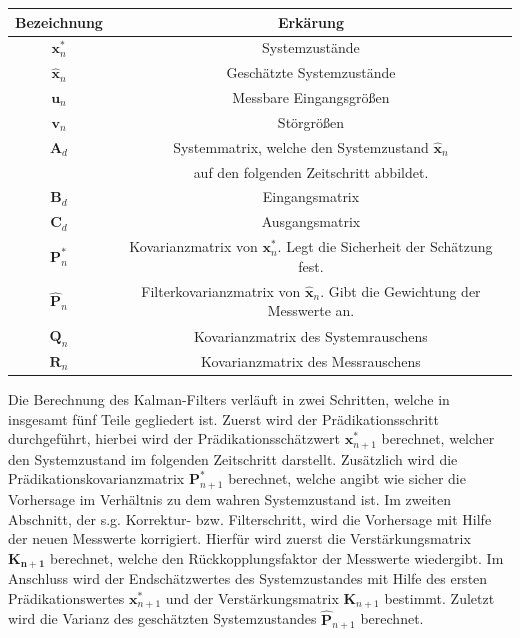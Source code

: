 \begin{table}[h!]
\centering
\begin{tabularx}{0.9\textwidth}{|c|c|}
\hline
 \textbf{Bezeichnung}  	& \textbf{Erkärung} \\ \hline
 $\boldsymbol{x}^*_n$	&	Systemzustände \\ \hline
 $\hat{\boldsymbol{x}}_n$ & Geschätzte Systemzustände \\ \hline 
 $\boldsymbol{u}_n$		& 	Messbare Eingangsgrößen  \\ \hline
 $\boldsymbol{v}_n$		&	Störgrößen \\ \hline
 $\boldsymbol{A}_d$ 	& 	Systemmatrix, welche den Systemzustand $\hat{\boldsymbol{x}}_n$  \\  & auf den folgenden Zeitschritt abbildet. \\ \hline
 $\boldsymbol{B}_d$		&	Eingangsmatrix \\ \hline
 $\boldsymbol{C}_d$		&	Ausgangsmatrix \\ \hline
 $\boldsymbol{P}^*_n$	&	Kovarianzmatrix von $\boldsymbol{x}^*_n$. Legt die Sicherheit der Schätzung fest. \\ \hline
 $\hat{\boldsymbol{P}}_n$ & Filterkovarianzmatrix von $\hat{\boldsymbol{x}}_n$. Gibt die Gewichtung der Messwerte an. \\ \hline
 $\boldsymbol{Q}_n$		&	Kovarianzmatrix des Systemrauschens \\ \hline
 $\boldsymbol{R}_n$		& 	Kovarianzmatrix des Messrauschens \\ \hline
\end{tabularx}
\end{table}

Die Berechnung des Kalman-Filters verläuft in zwei Schritten, welche in insgesamt fünf Teile gegliedert ist. Zuerst wird der Prädikationsschritt durchgeführt, hierbei wird der Prädikationsschätzwert $\boldsymbol{x}^*_{n+1}$ berechnet, welcher den Systemzustand im folgenden Zeitschritt darstellt. Zusätzlich wird die Prädikationskovarianzmatrix $\boldsymbol{P}^*_{n+1}$ berechnet, welche angibt wie sicher die Vorhersage im Verhältnis zu dem wahren Systemzustand ist.
Im zweiten Abschnitt, der s.g. Korrektur- bzw. Filterschritt, wird die Vorhersage mit Hilfe der neuen Messwerte korrigiert. Hierfür wird zuerst die Verstärkungsmatrix $\boldsymbol{K_{n+1}}$ berechnet, welche den Rückkopplungsfaktor der Messwerte wiedergibt. Im Anschluss wird der Endschätzwertes des Systemzustandes mit Hilfe des ersten Prädikationswertes $\boldsymbol{x}^*_{n+1}$ und der Verstärkungsmatrix $\boldsymbol{K}_{n+1}$ bestimmt. Zuletzt wird die Varianz des geschätzten Systemzustandes $\hat{\boldsymbol{P}}_{n+1}$ berechnet.

